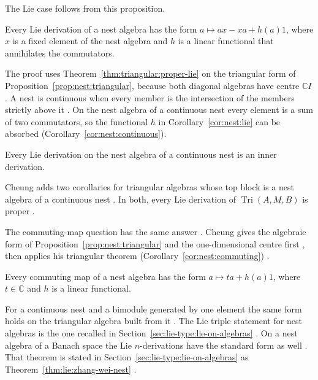 The Lie case follows from this proposition.

\begin{corollary}\label{cor:nest:lie}
Every Lie derivation of a nest algebra has the form $a\mapsto ax-xa+h(a)1$, where
$x$ is a fixed element of the nest algebra and $h$ is a linear functional that
annihilates the commutators.
\end{corollary}

The proof uses Theorem~\ref{thm:triangular:proper-lie} on the triangular form
of Proposition~\ref{prop:nest:triangular}, because both diagonal algebras have
centre $\mathbb{C}I$ \cite[p.~309]{Cheung2003}. A nest is continuous when
every member is the intersection of the members strictly above it
\cite[p.~309]{Cheung2003}. On the nest algebra of a continuous nest every
element is a sum of two commutators, so the functional $h$ in
Corollary~\ref{cor:nest:lie} can be absorbed \cite[p.~309]{Cheung2003}
(Corollary~\ref{cor:nest:continuous}).

\begin{corollary}\label{cor:nest:continuous}
Every Lie derivation on the nest algebra of a continuous nest is an inner
derivation.
\end{corollary}

Cheung adds two corollaries for triangular algebras whose top block is a nest
algebra of a continuous nest \cite[Corollaries~24--25, p.~309]{Cheung2003}. In
both, every Lie derivation of $\operatorname{Tri}(A,M,B)$ is proper
\cite[p.~309]{Cheung2003}.

The commuting-map question has the same answer
\cite[Corollary~7, p.~126]{Cheung2001}. Cheung gives the algebraic form of
Proposition~\ref{prop:nest:triangular} and the one-dimensional centre first
\cite[Propositions~5--6, p.~126]{Cheung2001}, then applies his triangular theorem (Corollary~\ref{cor:nest:commuting})
\cite[Corollary~1, p.~124]{Cheung2001}.\begin{corollary}\label{cor:nest:commuting}
Every commuting map of a nest algebra has the form $a\mapsto ta+h(a)1$, where
$t\in\mathbb{C}$ and $h$ is a linear functional.
\end{corollary}

For a continuous nest and a bimodule generated by one element the same form
holds on the triangular algebra built from it \cite[Corollary~8,
p.~127]{Cheung2001}. The Lie triple statement for nest algebras is the one
recalled in Section~\ref{sec:lie-type:lie-on-algebras} \cite[Corollary~5.12,
p.~163]{Benkovic2015}. On a nest algebra of a Banach space the Lie
$n$-derivations have the standard form as well \cite[Theorem~3.1,
p.~397]{ZhangWei2017Nest}. That theorem is stated in
Section~\ref{sec:lie-type:lie-on-algebras} as
Theorem~\ref{thm:lie:zhang-wei-nest} \cite[p.~6]{ZhangWei2017Nest}.

